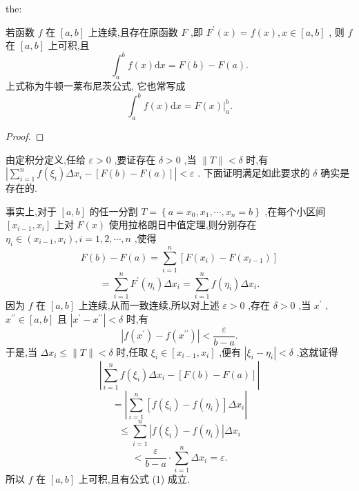 \begin{theorem}{}{the:}

\end{theorem}
 若函数 \(f\) 在 \(\left\lbrack  {a,b}\right\rbrack\) 上连续,且存在原函数 \(F\) ,即 \({F}^{\prime }\left( x\right)  = f\left( x\right) ,x \in  \left\lbrack  {a,b}\right\rbrack\) , 则 \(f\) 在 \(\left\lbrack  {a,b}\right\rbrack\) 上可积,且
\[
{\int }_{a}^{b}f\left( x\right) \mathrm{d}x = F\left( b\right)  - F\left( a\right) . \tag{1}
\]
上式称为牛顿一莱布尼茨公式, 它也常写成
\[
{\int }_{a}^{b}f\left( x\right) \mathrm{d}x = {\left. F\left( x\right) \right| }_{a}^{b}.
\]
\begin{proof}

\end{proof}
由定积分定义,任给 \(\varepsilon  > 0\) ,要证存在 \(\delta  > 0\) ,当 \(\parallel T\parallel  < \delta\) 时,有 \(\left| {\mathop{\sum }\limits_{{i = 1}}^{n}f\left( {\xi }_{i}\right) \Delta {x}_{i} - \left\lbrack  {F\left( b\right)  - F\left( a\right) }\right\rbrack  }\right|  < \varepsilon\) . 下面证明满足如此要求的 \(\delta\) 确实是存在的.

事实上,对于 \(\left\lbrack  {a,b}\right\rbrack\) 的任一分割 \(T = \left\{  {a = {x}_{0},{x}_{1},\cdots ,{x}_{n} = b}\right\}\) ,在每个小区间 \(\left\lbrack  {{x}_{i - 1},{x}_{i}}\right\rbrack\) 上对 \(F\left( x\right)\) 使用拉格朗日中值定理,则分别存在 \({\eta }_{i} \in  \left( {{x}_{i - 1},{x}_{i}}\right) ,i = 1,2,\cdots ,n\) ,使得
\[
F\left( b\right)  - F\left( a\right)  = \mathop{\sum }\limits_{{i = 1}}^{n}\left\lbrack  {F\left( {x}_{i}\right)  - F\left( {x}_{i - 1}\right) }\right\rbrack
\]
\[
= \mathop{\sum }\limits_{{i = 1}}^{n}{F}^{\prime }\left( {\eta }_{i}\right) \Delta {x}_{i} = \mathop{\sum }\limits_{{i = 1}}^{n}f\left( {\eta }_{i}\right) \Delta {x}_{i}. \tag{2}
\]
因为 \(f\) 在 \(\left\lbrack  {a,b}\right\rbrack\) 上连续,从而一致连续,所以对上述 \(\varepsilon  > 0\) ,存在 \(\delta  > 0\) ,当 \({x}^{\prime }\) , \({x}^{\prime \prime } \in  \left\lbrack  {a,b}\right\rbrack\) 且 \(\left| {{x}^{\prime } - {x}^{\prime \prime }}\right|  < \delta\) 时,有
\[
\left| {f\left( {x}^{\prime }\right)  - f\left( {x}^{\prime \prime }\right) }\right|  < \frac{\varepsilon }{b - a}.
\]
于是,当 \(\Delta {x}_{i} \leq  \parallel T\parallel  < \delta\) 时,任取 \({\xi }_{i} \in  \left\lbrack  {{x}_{i - 1},{x}_{i}}\right\rbrack\) ,便有 \(\left| {{\xi }_{i} - {\eta }_{i}}\right|  < \delta\) ,这就证得
\[
\left| {\mathop{\sum }\limits_{{i = 1}}^{n}f\left( {\xi }_{i}\right) \Delta {x}_{i} - \left\lbrack  {F\left( b\right)  - F\left( a\right) }\right\rbrack  }\right|
\]
\[
= \left| {\mathop{\sum }\limits_{{i = 1}}^{n}\left\lbrack  {f\left( {\xi }_{i}\right)  - f\left( {\eta }_{i}\right) }\right\rbrack  \Delta {x}_{i}}\right|
\]
\[
\leq  \mathop{\sum }\limits_{{i = 1}}^{n}\left| {f\left( {\xi }_{i}\right)  - f\left( {\eta }_{i}\right) }\right| \Delta {x}_{i}
\]
\[
< \frac{\varepsilon }{b - a} \cdot  \mathop{\sum }\limits_{{i = 1}}^{n}\Delta {x}_{i} = \varepsilon .
\]
所以 \(f\) 在 \(\left\lbrack  {a,b}\right\rbrack\) 上可积,且有公式 (1) 成立.


